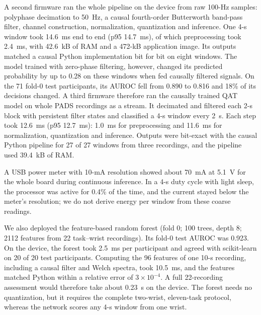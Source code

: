 \documentclass[preprint,12pt]{elsarticle}
\begin{document}
A second firmware ran the whole pipeline on the device from raw 100-Hz samples: polyphase decimation to 50~Hz, a causal fourth-order Butterworth band-pass filter, channel construction, normalization, quantization and inference. One 4-s window took 14.6~ms end to end (p95 14.7~ms), of which preprocessing took 2.4~ms, with 42.6~kB of RAM and a 472-kB application image. Its outputs matched a causal Python implementation bit for bit on eight windows. The model trained with zero-phase filtering, however, changed its predicted probability by up to 0.28 on these windows when fed causally filtered signals. On the 71 fold-0 test participants, its AUROC fell from 0.890 to 0.816 and 18\% of its decisions changed. A third firmware therefore ran the causally trained QAT model on whole PADS recordings as a stream. It decimated and filtered each 2-s block with persistent filter states and classified a 4-s window every 2~s. Each step took 12.6~ms (p95 12.7~ms): 1.0~ms for preprocessing and 11.6~ms for normalization, quantization and inference. Outputs were bit-exact with the causal Python pipeline for 27 of 27 windows from three recordings, and the pipeline used 39.4~kB of RAM.

A USB power meter with 10-mA resolution showed about 70~mA at 5.1~V for the whole board during continuous inference. In a 4-s duty cycle with light sleep, the processor was active for 0.4\% of the time, and the current stayed below the meter's resolution; we do not derive energy per window from these coarse readings.

We also deployed the feature-based random forest (fold 0; 100 trees, depth 8; 2112 features from 22 task--wrist recordings). Its fold-0 test AUROC was 0.923. On the device, the forest took 2.5~ms per participant and agreed with scikit-learn on 20 of 20 test participants. Computing the 96 features of one 10-s recording, including a causal filter and Welch spectra, took 10.5~ms, and the features matched Python within a relative error of $3\times10^{-4}$. A full 22-recording assessment would therefore take about 0.23~s on the device. The forest needs no quantization, but it requires the complete two-wrist, eleven-task protocol, whereas the network scores any 4-s window from one wrist.
\end{document}
